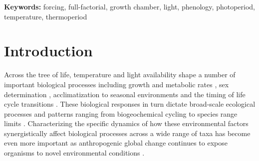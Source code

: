 \documentclass[11pt]{article}
\begin{document}
\textbf{Keywords:}  forcing, full-factorial,  growth chamber, light,  phenology, photoperiod, temperature, thermoperiod \\
\pagebreak
\section*{Introduction}
\noindent Across the tree of life, temperature and light availability shape a number of important biological processes including growth and metabolic rates \citep{MacLean:2019aa}, sex determination \citep{Brown:2014vn}, acclimatization to seasonal environments \citep{Hamilton2016} and the timing of life cycle transitions \citep[i.e., phenology,][]{Forrest2010}. These biological responses in turn dictate broad-scale ecological processes and patterns ranging from biogeochemical cycling \citep{Piao2007} to species range limits \citep{Chuine2001}. Characterizing the specific dynamics of how these environmental factors synergistically affect biological processes across a wide range of taxa has become even more important as anthropogenic global change continues to expose organisms to novel environmental conditions \citep{Portner:2008vd}.
\end{document}
